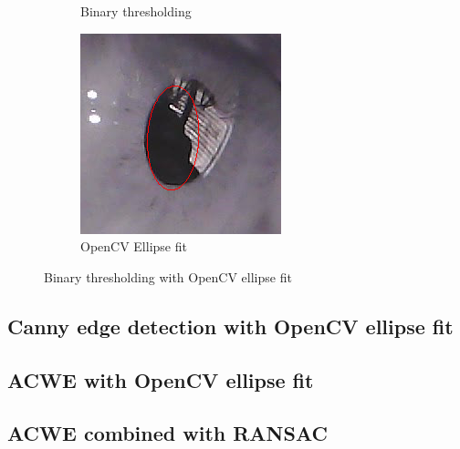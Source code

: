 \begin{figure}[h]
\begin{subfigure}{0.3\textwidth}
        \caption{Binary thresholding}
    \end{subfigure}%
    \hfill
    \begin{subfigure}{0.3\textwidth}
        \centering
        \includegraphics[width=0.9\linewidth]{plots/results/roi_result_binary_ellipse.png}
        \caption{OpenCV Ellipse fit}
    \end{subfigure}%
    \caption{Binary thresholding with OpenCV ellipse fit}
    \label{fig:binary_threshold_ellipse_fit}
\end{figure}

\subsection{Canny edge detection with OpenCV ellipse fit}


\subsection{ACWE with OpenCV ellipse fit}


\subsection{ACWE combined with RANSAC}

